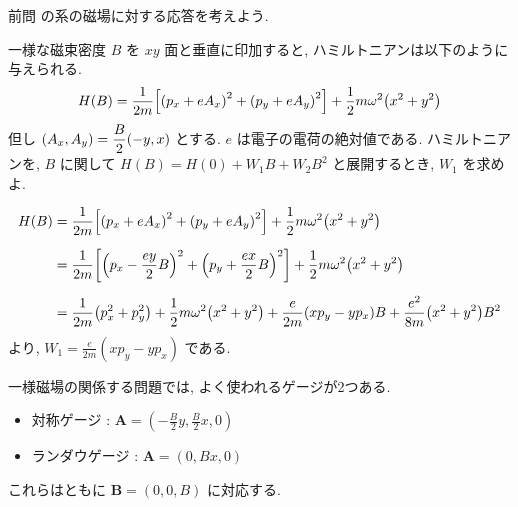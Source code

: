 \documentclass[../../ou-physics-exam.tex]{subfiles}
\begin{document}
前問 \setcounter{prob}{2}  の系の磁場に対する応答を考えよう.

一様な磁束密度 $ B $ を $ xy $ 面と垂直に印加すると, ハミルトニアンは以下のように与えられる.
\begin{align*}
    H(B) = \frac{1}{2m} \qty[\qty(p_x + e A_x)^2 + \qty(p_y + e A_y)^2 ] + \frac{1}{2} m \omega^2 \qty(x^2 + y^2)
\end{align*}
但し $ \displaystyle \qty(A_x, A_y) = \frac{B}{2} (-y, x) $ とする. 
$ e $ は電子の電荷の絶対値である. 
ハミルトニアンを, $ B $ に関して $ H(B) = H(0) + W_1 B + W_2 B^2 $ と展開するとき, $ W_1 $ を求めよ.
\begin{answer}
    \begin{align*}
        H(B) 
        & = \frac{1}{2m} \qty[\qty(p_x + e A_x)^2 + \qty(p_y + e A_y)^2 ] + \frac{1}{2} m \omega^2 \qty(x^2 + y^2) \\[2mm]
        & = \frac{1}{2m} \qty[\qty(p_x - \frac{ey}{2} B)^2 + \qty(p_y + \frac{ex}{2} B)^2 ] + \frac{1}{2} m \omega^2 \qty(x^2 + y^2) \\[2mm]
        & = \frac{1}{2m} \qty(p_x^2 + p_y^2) + \frac{1}{2} m \omega^2 \qty(x^2 + y^2) + \frac{e}{2m} \qty(xp_y - yp_x) B + \frac{e^2}{8m} \qty(x^2 + y^2) B^2
    \end{align*}
    より, $ \displaystyle W_1 = \frac{e}{2m} (xp_y - yp_x) $ である.
\end{answer}
\begin{supplement}
    一様磁場の関係する問題では, よく使われるゲージが2つある.
    \begin{itemize}
        \item 対称ゲージ : $ \displaystyle \bm{A} = (- \frac{B}{2} y, \frac{B}{2} x, 0) $ \\[-3mm]
        \item ランダウゲージ : $ \bm{A} = (0, Bx, 0) $
    \end{itemize}
    これらはともに $ \bm{B} = (0, 0, B) $ に対応する.
\end{supplement}
\end{document}
